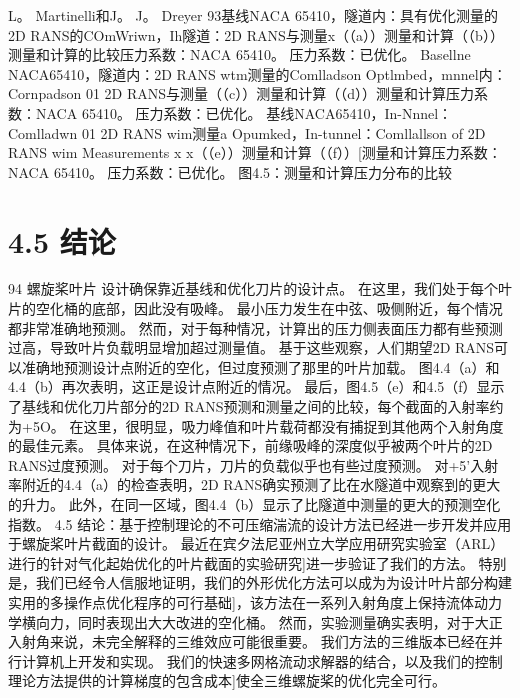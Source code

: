 \documentclass[UTF8,11pt,a4paper,openany,fontset=fandol]{ctexbook}
\begin{document}
L。 Martinelli和J。 J。 Dreyer 93基线NACA 65410，隧道内：具有优化测量的2D RANS的COmWriwn，Ih隧道：2D RANS与测量x（（a））测量和计算（（b））测量和计算的比较压力系数：NACA 65410。 压力系数：已优化。 Basellne NACA65410，隧道内：2D RANS wtm测量的Comlladson Optlmbed，mnnel内：Cornpadson 01 2D RANS与测量（（c））测量和计算（（d））测量和计算压力系数：NACA 65410。 压力系数：已优化。 基线NACA65410，In-Nnnel：Comlladwn 01 2D RANS wim测量a Opumked，In-tunnel：Comllallson of 2D RANS wim Measurements x x（（e））测量和计算（（f））[测量和计算压力系数：NACA 65410。 压力系数：已优化。 图4.5：测量和计算压力分布的比较

\section{4.5 结论}
94 螺旋桨叶片 设计确保靠近基线和优化刀片的设计点。 在这里，我们处于每个叶片的空化桶的底部，因此没有吸峰。 最小压力发生在中弦、吸侧附近，每个情况都非常准确地预测。 然而，对于每种情况，计算出的压力侧表面压力都有些预测过高，导致叶片负载明显增加超过测量值。 基于这些观察，人们期望2D RANS可以准确地预测设计点附近的空化，但过度预测了那里的叶片加载。 图4.4（a）和4.4（b）再次表明，这正是设计点附近的情况。 最后，图4.5（e）和4.5（f）显示了基线和优化刀片部分的2D RANS预测和测量之间的比较，每个截面的入射率约为+5O。 在这里，很明显，吸力峰值和叶片载荷都没有捕捉到其他两个入射角度的最佳元素。 具体来说，在这种情况下，前缘吸峰的深度似乎被两个叶片的2D RANS过度预测。 对于每个刀片，刀片的负载似乎也有些过度预测。 对+5'入射率附近的4.4（a）的检查表明，2D RANS确实预测了比在水隧道中观察到的更大的升力。 此外，在同一区域，图4.4（b）显示了比隧道中测量的更大的预测空化指数。 4.5 结论：基于控制理论的不可压缩湍流的设计方法已经进一步开发并应用于螺旋桨叶片截面的设计。 最近在宾夕法尼亚州立大学应用研究实验室（ARL）进行的针对气化起始优化的叶片截面的实验研究]进一步验证了我们的方法。 特别是，我们已经令人信服地证明，我们的外形优化方法可以成为为设计叶片部分构建实用的多操作点优化程序的可行基础]，该方法在一系列入射角度上保持流体动力学横向力，同时表现出大大改进的空化桶。 然而，实验测量确实表明，对于大正入射角来说，未完全解释的三维效应可能很重要。 我们方法的三维版本已经在并行计算机上开发和实现。 我们的快速多网格流动求解器的结合，以及我们的控制理论方法提供的计算梯度的包含成本]使全三维螺旋桨的优化完全可行。
\end{document}

